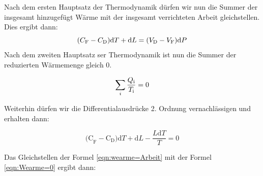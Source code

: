 Nach dem ersten Hauptsatz der Thermodynamik dürfen wir nun die Summer der insgesamt hinzugefügt Wärme mit der insgesamt 
verrichteten Arbeit gleichstellen. Dies ergibt dann:        
\begin{equation}
    (C_\text{F}-C_\text{D}\text{)d}T + \text{d}L = \text{(}V_\text{D}-V_\text{F}\text{)d}P\\
    \label{eqn:wearme=Arbeit}
\end{equation}
Nach dem zweiten Hauptsatz ser Thermodynamik ist nun die Summer der reduzierten Wärmemenge gleich 0.

\begin{equation}
    \sum_{i}\frac{Q_\text{i}}{T_\text{i}}=0\nonumber\\
\end{equation}

Weiterhin dürfen wir die Differentialausdrücke 2. Ordnung vernachlässigen und erhalten dann:

\begin{equation}
    \text{(C}_\text{F} - \text{C}_\text{D}\text{)d}T + \text{d}L -\frac{L\text{d}T}{T}= 0
    \label{eqn:Wearme=0}
\end{equation}

Das Gleichstellen der Formel \eqref{eqn:wearme=Arbeit} mit der Formel \eqref{eqn:Wearme=0} ergibt dann:

